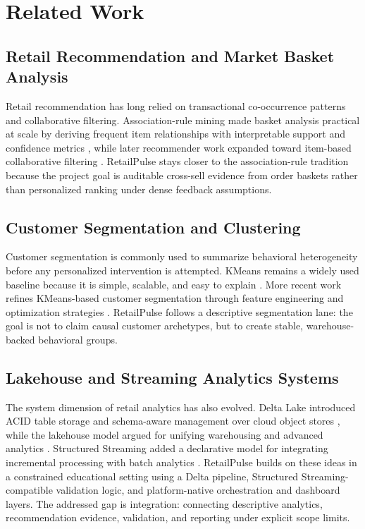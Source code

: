 \documentclass[journal]{IEEEtran}
\begin{document}
\section{Related Work}
\subsection{Retail Recommendation and Market Basket Analysis}
Retail recommendation has long relied on transactional co-occurrence patterns and collaborative filtering. Association-rule mining made basket analysis practical at scale by deriving frequent item relationships with interpretable support and confidence metrics \cite{agrawal1994association}, while later recommender work expanded toward item-based collaborative filtering \cite{sarwar2001itembased}. RetailPulse stays closer to the association-rule tradition because the project goal is auditable cross-sell evidence from order baskets rather than personalized ranking under dense feedback assumptions.

\subsection{Customer Segmentation and Clustering}
Customer segmentation is commonly used to summarize behavioral heterogeneity before any personalized intervention is attempted. KMeans remains a widely used baseline because it is simple, scalable, and easy to explain \cite{macqueen1967kmeans}. More recent work refines KMeans-based customer segmentation through feature engineering and optimization strategies \cite{li2021customersegmentation}. RetailPulse follows a descriptive segmentation lane: the goal is not to claim causal customer archetypes, but to create stable, warehouse-backed behavioral groups.

\subsection{Lakehouse and Streaming Analytics Systems}
The system dimension of retail analytics has also evolved. Delta Lake introduced ACID table storage and schema-aware management over cloud object stores \cite{armbrust2020deltalake}, while the lakehouse model argued for unifying warehousing and advanced analytics \cite{zaharia2021lakehouse}. Structured Streaming added a declarative model for integrating incremental processing with batch analytics \cite{armbrust2018structured}. RetailPulse builds on these ideas in a constrained educational setting using a Delta pipeline, Structured Streaming-compatible validation logic, and platform-native orchestration and dashboard layers. The addressed gap is integration: connecting descriptive analytics, recommendation evidence, validation, and reporting under explicit scope limits.
\end{document}

